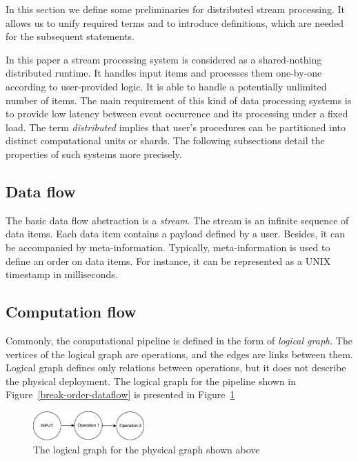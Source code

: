 

\label {fs-stream}

In this section we define some preliminaries for distributed stream processing. It allows us to unify required terms and to introduce definitions, which are needed for the subsequent statements.

In this paper a stream processing system is considered as a shared-nothing distributed runtime. It handles input items and processes them one-by-one according to user-provided logic. It is able to handle a potentially unlimited number of items. The main requirement of this kind of data processing systems is to provide low latency between event occurrence and its processing under a fixed load. The term {\em distributed} implies that user's procedures can be partitioned into distinct computational units or shards. The following subsections detail the properties of such systems more precisely.  

\subsection{Data flow}
The basic data flow abstraction is a {\it stream}. The stream is an infinite sequence of data items. Each data item contains a payload defined by a user. Besides, it can be accompanied by meta-information. Typically, meta-information is used to define an order on data items. For instance, it can be represented as a UNIX timestamp in milliseconds.



\subsection{Computation flow}
Commonly, the computational pipeline is defined in the form of {\it logical graph}. The vertices of the logical graph are operations, and the edges are links between them. Logical graph defines only relations between operations, but it does not describe the physical deployment. The logical graph for the pipeline shown in Figure~\ref{break-order-dataflow} is presented in Figure~\ref{break-order-dataflow-logical}

\begin{figure}[htbp]
  \centering
  \includegraphics[width=0.38\textwidth]{pics/break_order_pipeline_logical}
  \caption{The logical graph for the physical graph shown above} 
  \label {break-order-dataflow-logical}
\end{figure}

